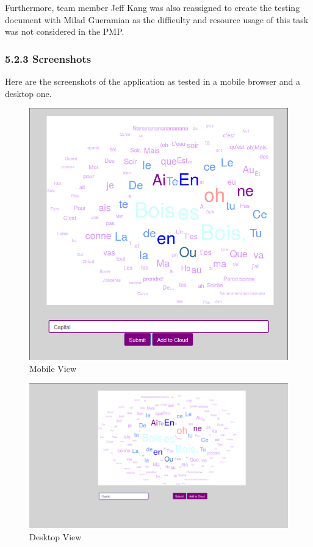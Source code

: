 \documentclass[]{article}
\begin{document}
Furthermore, team member Jeff Kang was also reassigned to create the
testing document with Milad Gueramian as the difficulty and resource
usage of this task was not considered in the PMP.

\subsubsection{\textbf{5.2.3 Screenshots}}\label{screenshots}

Here are the screenshots of the application as tested in a mobile browser and a desktop one.

\begin{figure}[htbp]
\centering
\includegraphics{mobile.png}
\caption{Mobile View}
\end{figure}


\begin{figure}[htbp]
\centering
\includegraphics{desktop.png}
\caption{Desktop View}
\end{figure}
\end{document}
